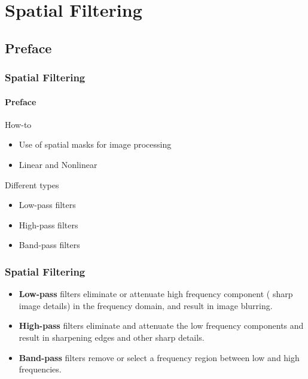 \documentclass[table]{beamer}
\begin{document}
\section{Spatial Filtering}

\subsection{Preface}

\begin{frame}
  \frametitle{Spatial Filtering}
  \framesubtitle{Preface}
  \begin{block}{How-to}
    \begin{itemize}
    \item Use of spatial masks for image processing 
    \item Linear and Nonlinear 
    \end{itemize}
  \end{block}
  \begin{block}{Different types}
    \begin{itemize}
    \item Low-pass filters 
    \item High-pass filters 
    \item Band-pass filters
    \end{itemize}
  \end{block}
\end{frame}

\begin{frame}
\frametitle{Spatial Filtering}
\begin{itemize}
  \item \textbf{Low-pass} filters eliminate or attenuate high frequency component ({\color{blue} sharp image details}) in the frequency domain, and result in image {\color{blue} blurring}.
    \item \textbf{High-pass} filters eliminate and attenuate the low frequency components and result in {\color{blue} sharpening edges} and other sharp details. 
      \item \textbf{Band-pass} filters remove or select a frequency region between low and high frequencies. 
\end{itemize}
\end{frame}
\end{document}
